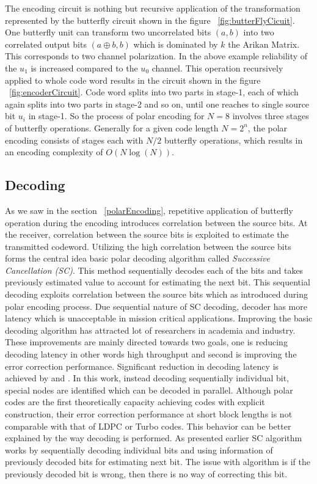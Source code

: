 The encoding circuit is nothing but recursive application of the transformation represented by the butterfly circuit shown in the figure ~\ref{fig:butterFlyCicuit}. One butterfly unit can transform two uncorrelated bits $(a,b)$ into two correlated output bits $(a\oplus b,b)$ which is dominated by $k$ the Arikan Matrix. This corresponds to two channel polarization. In the above example reliability of the $u_{1}$ is increased compared to the $u_{0}$ channel. This operation recursively applied to whole code word results in the circuit shown in the figure ~\ref{fig:encoderCircuit}. Code word splits into two parts in stage-1, each of which again splits into two parts in stage-2 and so on, until one reaches to single source bit $u_{i}$ in stage-1. So the process of polar encoding for $N = 8$ involves three stages of butterfly operations. Generally for a given code length $N=2^{n}$, the polar encoding consists of stages each with $N/2$ butterfly operations, which results in an encoding complexity of $O(N\log(N))$.



\subsection{Decoding}
As we saw in the section ~\ref{polarEncoding}, repetitive application of butterfly operation during the encoding introduces correlation between the source bits. At the receiver, correlation between the source bits is exploited to estimate the transmitted codeword. Utilizing the high correlation between the source bits forms the central idea basic polar decoding algorithm called \emph{Successive Cancellation (SC)}. This method sequentially decodes each of the bits and takes previously estimated value to account for estimating the next bit. This sequential decoding exploits correlation between the source bits which as introduced during polar encoding process. Due sequential nature of SC decoding, decoder has more latency which is unacceptable in mission critical applications. Improving the basic decoding algorithm has attracted lot of researchers in academia and industry. These improvements are mainly directed towards two goals, one is reducing decoding latency in other words high throughput and second is improving the error correction performance. Significant reduction in decoding latency is achieved by \cite{SSC} and \cite{fastSSC}. In this work, instead decoding sequentially individual bit, special nodes are identified which can be decoded in parallel. Although polar codes are the first theoretically capacity achieving codes with explicit construction, their error correction performance at short block lengths is not comparable with that of LDPC or Turbo codes. This behavior can be better explained by the way decoding is performed. As presented earlier SC algorithm works by sequentially decoding individual bits and using information of previously decoded bits for estimating next bit. The issue with algorithm is if the previously decoded bit is wrong, then there is no way of correcting this bit.

